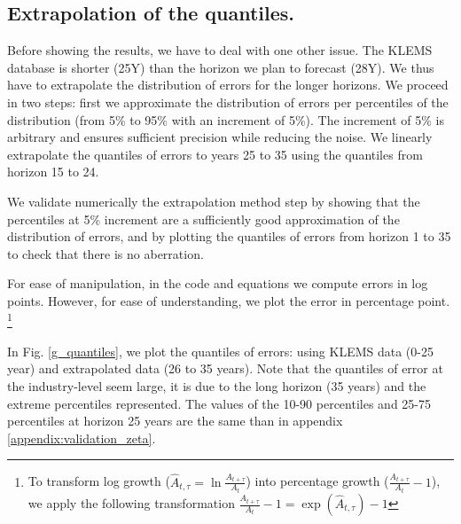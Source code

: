 \documentclass[11pt]{article}
\begin{document}
\subsection{Extrapolation of the quantiles.} 

Before showing the results, we have to deal with one other issue. The KLEMS database is shorter (25Y) than the horizon we plan to forecast (28Y). We thus have to extrapolate the distribution of errors for the longer horizons. We proceed in two steps: first we approximate the distribution of errors per percentiles of the distribution (from 5\% to 95\% with an increment of 5\%). The increment of 5\% is arbitrary and ensures sufficient precision while reducing the noise. We linearly extrapolate the quantiles of errors to years 25 to 35 using the quantiles from horizon 15 to 24.

We validate numerically the extrapolation method step by showing that the percentiles at 5\% increment are a sufficiently good approximation of the distribution of errors, and by plotting the quantiles of errors from horizon 1 to 35 to check that there is no aberration. 

For ease of manipulation, in the code and equations we compute errors in log points. However, for ease of understanding, we plot the error in percentage point.
\footnote{
To transform log growth ($\hat{A}_{t,\tau}=\ln\frac{A_{t+\tau}}{A_{t}}$) into percentage growth ($\frac{A_{t+\tau}}{A_{t}}-1$), we apply the following transformation $\frac{A_{t+\tau}}{A_{t}}-1=\exp (\hat{A}_{t,\tau})-1$
}

In Fig. \ref{g_quantiles}, we plot the quantiles of errors: using KLEMS data (0-25 year) and extrapolated data (26 to 35 years). Note that the quantiles of error at the industry-level seem large, it is due to the long horizon (35 years) and the extreme percentiles represented. The values of the 10-90 percentiles and 25-75 percentiles at horizon 25 years are the same than in appendix \ref{appendix:validation_zeta}.

     
\end{document}
